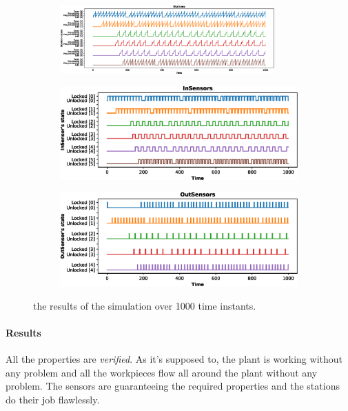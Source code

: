 \documentclass[a4paper]{article}
\begin{document}
    \begin{figure}[h!]
        \begin{subfigure}{\textwidth}
            \centering
            \includegraphics[width=0.9\textwidth]{images/scenarios/scenario1_stations}
        \end{subfigure}
        \begin{subfigure}{0.49\textwidth}
            \centering
            \includegraphics[width=\textwidth]{images/scenarios/scenario1_insensors}
        \end{subfigure}
        \hfill
        \begin{subfigure}{0.49\textwidth}
            \centering
            \includegraphics[width=\textwidth]{images/scenarios/scenario1_outsensors}
        \end{subfigure}
        \caption{the results of the simulation over 1000 time instants.}
    \end{figure}

    \paragraph{Results} All the properties are \textit{verified}. As it's supposed to, the plant is working without any problem and all the workpieces flow all around the plant without any problem. The sensors are guaranteeing the required properties and the stations do their job flawlessly.
\end{document}
